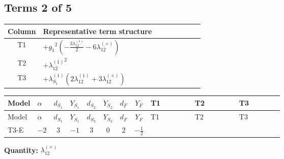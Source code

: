 \documentclass[8pt]{article}
\begin{document}
\begin{landscape}
\subsection*{Terms 2 of 5}
\begin{center}
\begin{tabular}{@{}c >{\raggedright\arraybackslash}p{0.82\linewidth}@{}}
\toprule
Column & Representative term structure \\
\midrule
T1 & \(\displaystyle +{g_1}^2 \left(-\frac{3 {\lambda_{12}^{(1)}}}{2}-6 {\lambda_{12}^{(\times)}}\right)\) \\
\midrule
T2 & \(\displaystyle +{\lambda_{12}^{(1)}}^2\) \\
\midrule
T3 & \(\displaystyle +{\lambda_{S_1}^{(1)}} (2 {\lambda_{12}^{(1)}}+3 {\lambda_{12}^{(\times)}})\) \\
\midrule
\bottomrule
\end{tabular}
\end{center}
\smallskip
\tiny
\begin{longtable}{@{}llcccccc >{\raggedright\arraybackslash}p{0.21\linewidth} >{\raggedright\arraybackslash}p{0.21\linewidth} >{\raggedright\arraybackslash}p{0.21\linewidth}@{}}
\toprule
Model & $\alpha$ & $d_{S_1}$ & $Y_{S_1}$ & $d_{S_2}$ & $Y_{S_2}$ & $d_F$ & $Y_F$ & T1 & T2 & T3 \\
\midrule
\endfirsthead
\toprule
Model & $\alpha$ & $d_{S_1}$ & $Y_{S_1}$ & $d_{S_2}$ & $Y_{S_2}$ & $d_F$ & $Y_F$ & T1 & T2 & T3 \\
\midrule
\endhead
T3-E & $-2$ & $3$ & $-1$ & $3$ & $0$ & $2$ & $-\frac{1}{2}$ & \scriptsize\adjustbox{max width=\linewidth}{$\begin{gathered} +{g_1}^2 \left(-\frac{3 {\lambda_{12}^{(1)}}}{2}-6 {\lambda_{12}^{(\times)}}\right)\end{gathered}$} & \scriptsize\adjustbox{max width=\linewidth}{$\begin{gathered} +{\lambda_{12}^{(1)}}^2\end{gathered}$} & \scriptsize\adjustbox{max width=\linewidth}{$\begin{gathered} +{\lambda_{S_1}^{(1)}} (2 {\lambda_{12}^{(1)}}+3 {\lambda_{12}^{(\times)}})\end{gathered}$} \\
\midrule
\bottomrule
\end{longtable}
\clearpage
\noindent\textbf{Quantity: }$\lambda_{12}^{(\times)}$\par\smallskip

\end{landscape}
\end{document}
